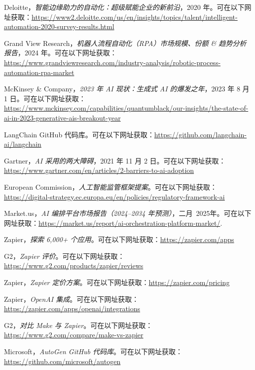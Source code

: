 \documentclass[11pt, a4paper, oneside]{article}
\begin{document}
\begin{thebibliography}{99}
    Deloitte，\textit{智能边缘助力的自动化：超级赋能企业的新前沿}，2020 年。可在以下网址获取：\url{https://www2.deloitte.com/us/en/insights/topics/talent/intelligent-automation-2020-survey-results.html}

    Grand View Research，\textit{机器人流程自动化（RPA）市场规模、份额 \& 趋势分析报告}，2024 年。可在以下网址获取：\url{https://www.grandviewresearch.com/industry-analysis/robotic-process-automation-rpa-market}

    McKinsey \& Company，\textit{2023 年 AI 现状：生成式 AI 的爆发之年}，2023 年 8 月 1 日。可在以下网址获取：\url{https://www.mckinsey.com/capabilities/quantumblack/our-insights/the-state-of-ai-in-2023-generative-ais-breakout-year}


    LangChain GitHub 代码库。可在以下网址获取：\url{https://github.com/langchain-ai/langchain}

    Gartner，\textit{AI 采用的两大障碍}，2021 年 11 月 2 日。可在以下网址获取：\url{https://www.gartner.com/en/articles/2-barriers-to-ai-adoption}

    European Commission，\textit{人工智能监管框架提案}。可在以下网址获取：\url{https://digital-strategy.ec.europa.eu/en/policies/regulatory-framework-ai}
    
    Market.us，\textit{AI 编排平台市场报告（2024--2034 年预测）}，二月~2025年。可在以下网址获取：\url{https://market.us/report/ai-orchestration-platform-market/}.

    Zapier，\textit{探索 6,000+ 个应用}。可在以下网址获取：\url{https://zapier.com/apps}

    G2，\textit{Zapier 评价}。可在以下网址获取：\url{https://www.g2.com/products/zapier/reviews}

    Zapier，\textit{Zapier 定价方案}。可在以下网址获取：\url{https://zapier.com/pricing}


    Zapier，\textit{OpenAI 集成}。可在以下网址获取：\url{https://zapier.com/apps/openai/integrations}

    G2，\textit{对比 Make 与 Zapier}。可在以下网址获取：\url{https://www.g2.com/compare/make-vs-zapier}


    Microsoft，\textit{AutoGen GitHub 代码库}。可在以下网址获取：\url{https://github.com/microsoft/autogen}


\end{thebibliography}
\end{document}
